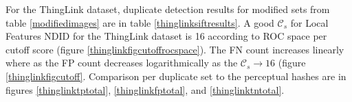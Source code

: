 \documentclass[english,12pt,a4paper,pdftex,elec,utf8, table]{aaltothesis}
\begin{document}

\clearpage

For the ThingLink dataset, duplicate detection results for modified sets from table \ref{modifiedimages} are in table \ref{thinglinksiftresults}. A good $\mathcal{C}_s$ for Local Features NDID for the ThingLink dataset is 16 according to ROC space per cutoff score (figure \ref{thinglinkfigcutoffrocspace}). The FN count increases linearly where as the FP count decreases logarithmically as the $\mathcal{C}_s \rightarrow 16$ (figure \ref{thinglinkfigcutoff}. Comparison per duplicate set to the perceptual hashes are in figures \ref{thinglinktptotal}, \ref{thinglinkfptotal}, and \ref{thinglinktntotal}.

\end{document}
